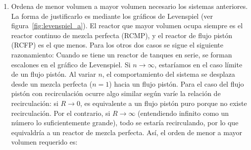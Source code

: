 \begin{enumerate}[label={\alph*)}]
	      \begin{equation*}
		      R = \frac{\text{caudal de recirculación}}{\text{caudal de salida}} = \frac{F_R}{F}
	      \end{equation*}

	      \noindent El balance de materia en el punto de mezcla queda de la siguiente forma:
	      \begin{align*}
		      F \cdot C_{A0} + F_R \cdot C_{AS} & = F(1 + R)C_{Ae}                                                                            \\[6pt]
		      C_{Ae}                            & = \frac{C_{A0} + R \cdot C_{AS}}{1 + R} \quad ; \quad X_{Ae} = \frac{C_{AR}-C_{Ae}}{C_{AR}} \\[6pt]
		      X_{Ae}                            & = \frac{X_{A0} + R\cdot X_{AS}}{1+R}
	      \end{align*}
	      \noindent Introduciéndolo en la ecuación del flujo pistón~\eqref{eq:RCFP_examen_unk} obtenemos:
	      \begin{equation*}
		      \tau = (1+R)\cdot C_{AR}\int_{X_{Ae}}^{X_{AS}}-\frac{dX_A}{r_A}
	      \end{equation*}
	      \noindent Con $T$ constante a $T_{\text{máx}}$.
	\item Ordena de menor volumen a mayor volumen necesario los sistemas anteriores.
	      \noindent La forma de justificarlo es mediante los gráficos de Levenspiel (ver figura~\ref{fig:levenspiel_a}). El reactor que mayor volumen ocupa siempre es el reactor continuo de mezcla perfecta (RCMP), y el reactor de flujo pistón (RCFP) es el que menos. Para los otros dos casos se sigue el siguiente razonamiento:
	      Cuando se tiene un reactor de tanques en serie, se forman escalones en el gráfico de Levenspiel. Si $n \to \infty$, estaríamos en el caso límite de un flujo pistón. Al variar $n$, el comportamiento del sistema se desplaza desde un mezcla perfecta ($n=1$) hacia un flujo pistón.
	      Para el caso del flujo pistón con recirculación ocurre algo similar según varíe la relación de recirculación: si $R \to 0$, es equivalente a un flujo pistón puro porque no existe recirculación. Por el contrario, si $R \to \infty$ (entendiendo infinito como un número lo suficientemente grande), todo se estaría recirculando, por lo que equivaldría a un reactor de mezcla perfecta. Así, el orden de menor a mayor volumen requerido es:
	      \begin{center}
		      \vspace{1em}
	      \end{center}
\end{enumerate}

